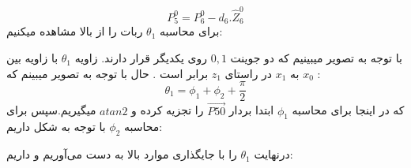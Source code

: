 \documentclass{article}
\begin{document}
\begin{figure}[H]%
    \centering
    \caption{\label{fig:formula21}}
\end{figure}
\begin{equation}
P_5^0 = P_6^0 - d_6 . \hat{Z}_6^0
\end{equation}
برای محاسبه $\theta_1$ ربات را از بالا مشاهده میکنیم:
\begin{figure}[H]%
	\centering
    \caption{\label{fig:formula22}}
\end{figure}
\noindent
با توجه به تصویر میبینیم که دو جوینت $0,1$ روی یکدیگر قرار دارند. زاویه $\theta_1$ با زاویه بین $x_0$ به $x_1$ در راستای $z_1$ برابر است . حال با توجه به تصویر میبینم که :
\begin{equation}
\theta_1 = \phi_1 + \phi_2 + \frac{\pi}{2}
\end{equation}
که در اینجا برای محاسبه $\phi_1$ ابتدا بردار $\overrightarrow{P50}$ را تجزیه کرده و $atan2$  میگیریم.سپس برای محاسبه  $\phi_2$ با توجه به شکل داریم:
\begin{figure}[H]%
	\centering
    \caption{\label{fig:formula23}}
\end{figure}
\noindent
درنهایت $\theta_1$ را با جایگذاری موارد بالا به دست می‌آوریم و داریم:
\begin{figure}[H]%
	\centering
    \caption{\label{fig:formula24}}
\end{figure}
\end{document}
